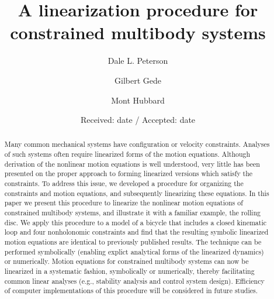 \documentclass[smallcondensed]{svjour3}                     %
\begin{document}
\title{A linearization procedure for constrained multibody systems}


\author{Dale L. Peterson\and Gilbert Gede\and Mont Hubbard}


\date{Received: date / Accepted: date}

\maketitle

\begin{abstract}
Many common mechanical systems have configuration or velocity constraints.
Analyses of such systems often require linearized forms of the motion
equations.  Although derivation of the nonlinear motion equations is well
understood, very little has been presented on the proper approach to
forming linearized versions which satisfy the constraints.
To address this issue, we developed a procedure for organizing the constraints
and motion equations, and subsequently linearizing these equations.
In this paper we present this procedure to linearize the nonlinear motion
equations of constrained multibody systems, and illustrate it with a familiar
example, the rolling disc.
We apply this procedure to a model of a bicycle that includes a closed
kinematic loop and four nonholonomic constraints and find that the resulting
symbolic linearized motion equations are identical to previously published
results.  The technique can be performed symbolically (enabling explict
analytical forms of the linearized dynamics) or numerically.
Motion equations for constrained multibody systems can now be linearized in a
systematic fashion, symbolically or numerically, thereby facilitating common
linear analyses (e.g., stability analysis and control system design).
Efficiency of computer implementations of this procedure will be considered in
future studies.
\end{abstract}
\end{document}

